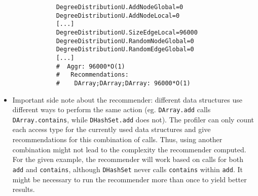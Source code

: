 \begin{itemize}
		\begin{verbatim}
			DegreeDistributionU.AddNodeGlobal=0
			DegreeDistributionU.AddNodeLocal=0
			[...]
			DegreeDistributionU.SizeEdgeLocal=96000
			DegreeDistributionU.RandomNodeGlobal=0
			DegreeDistributionU.RandomEdgeGlobal=0
			[...]
			#  Aggr: 96000*O(1)
			#   Recommendations:
			#    DArray;DArray;DArray: 96000*O(1)
		\end{verbatim}
		
		\item Important side note about the recommender: different data structures use different
			ways to perform the same action (eg. \texttt{DArray.add} calls
			\texttt{DArray.contains}, while \texttt{DHashSet.add} does not). The profiler can only
			count each access type for the currently used data structures and give recommendations
			for this combination of calls. Thus, using another combination might not lead to the
			complexity the recommender computed. For the given example, the recommender will work
			based on calls for both \texttt{add} and \texttt{contains}, although \texttt{DHashSet}
			never calls \texttt{contains} within \texttt{add}. It might be necessary to run the
			recommender more than once to yield better results.
	\end{itemize}
